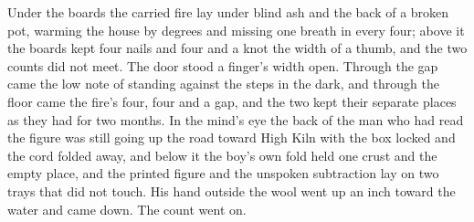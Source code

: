 Under the boards the carried fire lay under blind ash and the back of a broken pot, warming the house by degrees and missing one breath in every four; above it the boards kept four nails and four and a knot the width of a thumb, and the two counts did not meet. The door stood a finger's width open. Through the gap came the low note of  standing against the steps in the dark, and through the floor came the fire's four, four and a gap, and the two kept their separate places as they had for two months. In the mind's eye the back of the man who had read the figure was still going up the road toward High Kiln with the box locked and the cord folded away, and below it the boy's own fold held one crust and the empty place, and the printed figure and the unspoken subtraction lay on two trays that did not touch. His hand outside the wool went up an inch toward the water and came down. The count went on.

